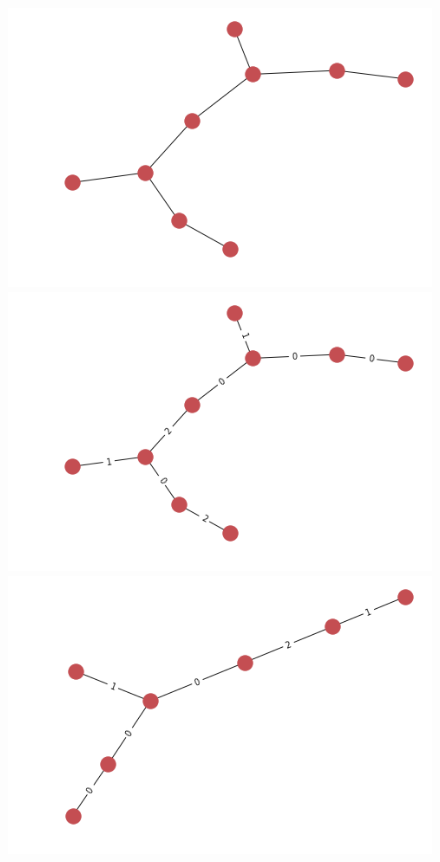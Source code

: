 \documentclass{article}
\theoremstyle{definition}
\begin{document}
\begin{figure}[!htb]
\begin{multicols}{4}
    \includegraphics[width=\linewidth]{data/generated-graphs/tree_base.png}\par
    \includegraphics[width=\linewidth]{data/generated-graphs/tree_labels.png}\par
    \includegraphics[width=\linewidth]{data/generated-graphs/tree_altered_struct.png}\par

\end{multicols}
\end{figure}
\end{document}

